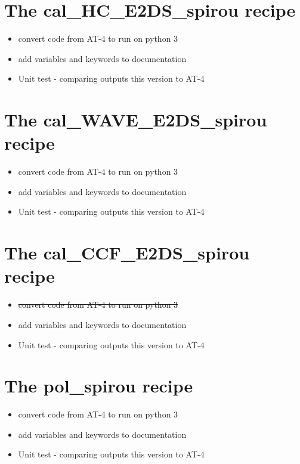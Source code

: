 \section{The cal\_HC\_E2DS\_spirou recipe}
\label{ch:todo:cal_HC_E2DS_spirou}

\begin{itemize}
	\item convert code from AT-4 to run on python 3
	\item add variables and keywords to documentation
	\item Unit test - comparing outputs this version to AT-4
\end{itemize}


\section{The cal\_WAVE\_E2DS\_spirou recipe}
\label{ch:todo:cal_WAVE_E2DS_spirou}

\begin{itemize}
	\item convert code from AT-4 to run on python 3
	\item add variables and keywords to documentation
	\item Unit test - comparing outputs this version to AT-4
\end{itemize}


\section{The cal\_CCF\_E2DS\_spirou recipe}
\label{ch:todo:cal_CCF_E2DS_spirou}

\begin{itemize}
	\item \sout{convert code from AT-4 to run on python 3}
	\item add variables and keywords to documentation
	\item Unit test - comparing outputs this version to AT-4
\end{itemize}


\section{The pol\_spirou recipe}
\label{ch:todo:pol_spirou}

\begin{itemize}
	\item convert code from AT-4 to run on python 3
	\item add variables and keywords to documentation
	\item Unit test - comparing outputs this version to AT-4
\end{itemize}
